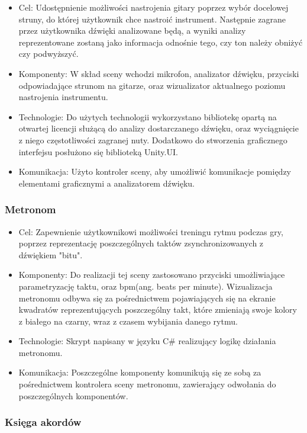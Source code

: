\begin{itemize}
\item Cel: Udostępnienie możliwości nastrojenia gitary poprzez wybór docelowej struny, do której użytkownik chce nastroić instrument. Następnie zagrane przez użytkownika dźwięki analizowane będą, a wyniki analizy reprezentowane zostaną jako informacja odnośnie tego, czy ton należy obniżyć czy podwyższyć.
\item Komponenty: W skład sceny wchodzi mikrofon, analizator dźwięku, przyciski odpowiadające strunom na gitarze, oraz wizualizator aktualnego poziomu nastrojenia instrumentu.  
\item Technologie: Do użytych technologii wykorzystano bibliotekę opartą na otwartej licencji służącą do analizy dostarczanego dźwięku, oraz wyciągnięcie z niego częstotliwości zagranej nuty. Dodatkowo do stworzenia graficznego interfejsu posłużono się biblioteką Unity.UI.   
\item Komunikacja: Użyto kontroler sceny, aby umożliwić komunikacje pomiędzy elementami graficznymi a analizatorem dźwięku. 
\end{itemize}

\subsubsection{Metronom}

\begin{itemize}
\item Cel: Zapewnienie użytkownikowi możliwości treningu rytmu podczas gry, poprzez reprezentację poszczególnych taktów zsynchronizowanych z dźwiękiem "bitu".
\item Komponenty: Do realizacji tej sceny zastosowano przyciski umożliwiające parametryzację taktu, oraz bpm(ang. beats per minute). Wizualizacja metronomu odbywa się za pośrednictwem pojawiających się na ekranie kwadratów reprezentujących poszczególny takt, które zmieniają swoje kolory z białego na czarny, wraz z czasem wybijania danego rytmu.
\item Technologie: Skrypt napisany w języku C\# realizujący logikę działania metronomu.
\item Komunikacja: Poszczególne komponenty komunikują się ze sobą za pośrednictwem kontrolera sceny metronomu, zawierający odwołania do poszczególnych komponentów.
\end{itemize}

\subsubsection{Księga akordów}

